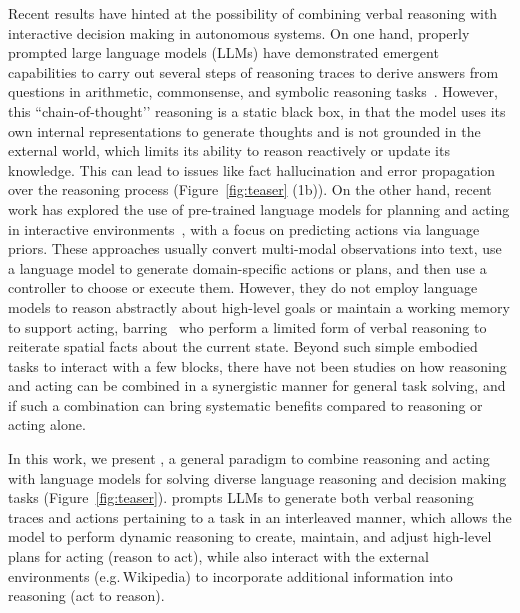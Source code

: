 Recent results have hinted at the possibility of combining verbal reasoning with interactive decision making in autonomous systems. 
On one hand, properly prompted large language models (LLMs) have demonstrated emergent capabilities to carry out several steps of reasoning traces to derive answers from questions in arithmetic, commonsense, and symbolic reasoning tasks~\citep{wei2022chain}.  However, this ``chain-of-thought’' reasoning is a static black box, in that the model uses its own internal representations to generate thoughts and is not grounded in the external world,
which limits its ability to reason reactively or update its knowledge. This can lead to issues like fact hallucination and error propagation over the reasoning process (Figure~\ref{fig:teaser} (1b)). 
On the other hand, recent work has explored the use of pre-trained language models for planning and acting in interactive environments~\citep{ahn2022do, nakano2021webgpt, yao2020keep, huang2022language}, {with a focus  on predicting actions via language priors.} These approaches usually convert multi-modal observations into text, use a language model to generate domain-specific actions or plans, and then use a controller to choose or execute them. 
However, they do not employ language models to reason abstractly about high-level goals or maintain a working memory to support acting, barring~\cite{huang2022inner} who perform a limited form of verbal reasoning to reiterate spatial facts about the current state.
Beyond such simple embodied tasks to interact with a few blocks, there have not been studies on how reasoning and acting can be combined in a synergistic manner for general task solving, and if such a combination can bring systematic benefits compared to reasoning or acting alone.



In this work, we present \model{}, a general paradigm to combine reasoning and acting with language models for solving diverse language reasoning and decision making tasks (Figure~\ref{fig:teaser}). 
\model{} prompts LLMs to generate both verbal reasoning traces and actions pertaining to a task in an interleaved manner, which allows the model to perform dynamic reasoning to create, maintain, and adjust high-level plans for acting (reason to act), while also interact with the external environments (e.g.\,Wikipedia) to incorporate additional information into reasoning (act to reason).

